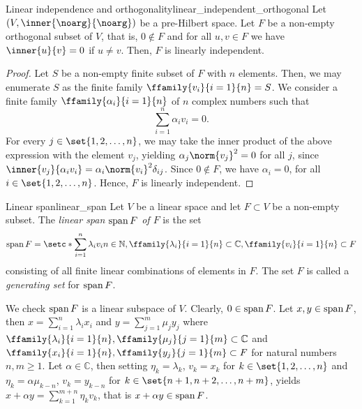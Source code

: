 \begin{lemma}{Linear independence and orthogonality}{linear_independent_orthogonal}
    Let \((V, \inner{\noarg}{\noarg})\) be a pre-Hilbert space. Let \(F\) be a non-empty orthogonal subset of \(V\), that is, \(0 \notin F\) and for all \(u,v \in F\) we have \(\inner{u}{v} = 0\) if \(u \neq v\). Then, \(F\) is linearly independent.
\end{lemma}
\begin{proof}
    Let \(S\) be a non-empty finite subset of \(F\) with \(n\) elements. Then, we may enumerate \(S\) as the finite family \(\ffamily{v_i}{i=1}{n} = S\). We consider a finite family \(\ffamily{\alpha_i}{i=1}{n}\) of \(n\) complex numbers such that
    \begin{equation*}
        \sum_{i =1}^n \alpha_i v_i = 0.
    \end{equation*}
    For every \(j \in \set{1,2,\dots, n}\), we may take the inner product of the above expression with the element \(v_j\), yielding \(\alpha_j \norm{v_j}^2 = 0\) for all \(j\), since \(\inner{v_j}{\alpha_i v_i} = \alpha_i \norm{v_i}^2 \delta_{ij}\). Since \(0 \notin F\), we have \(\alpha_i = 0\), for all \(i \in \set{1,2,\dots, n}\). Hence, \(F\) is linearly independent.
\end{proof}

\begin{definition}{Linear span}{linear_span}
    Let \(V\) be a linear space and let \(F \subset V\) be a non-empty subset. The \emph{linear span \(\operatorname{span}{F}\) of \(F\)} is the set
    \begin{equation*}
        \lspan{F} = \setc*{\sum_{i = 1}^n \lambda_i v_i}{n \in \mathbb{N}, \ffamily{\lambda_i}{i=1}{n} \subset \mathbb{C}, \ffamily{v_i}{i=1}{n}\subset F}
    \end{equation*}
    consisting of all finite linear combinations of elements in \(F\). The set \(F\) is called a \emph{generating set} for \(\operatorname{span}{F}\).
\end{definition}
\begin{remark}
    We check \(\operatorname{span} F\) is a linear subspace of \(V\). Clearly, \(0 \in \operatorname{span} F\). Let \(x, y \in \operatorname{span} F\), then \(x = \sum_{i = 1}^{n} \lambda_i x_i\) and \(y = \sum_{j = 1}^{m} \mu_j y_j\) where \(\ffamily{\lambda_i}{i=1}{n}, \ffamily{\mu_j}{j = 1}{m} \subset \mathbb{C}\) and \(\ffamily{x_i}{i=1}{n}, \ffamily{y_j}{j=1}{m} \subset F\) for natural numbers \(n,m \geq 1\). Let \(\alpha \in \mathbb{C}\), then setting \(\eta_k = \lambda_k\), \(v_k = x_k\) for \(k \in \set{1, 2, \dots, n}\) and \(\eta_{k} = \alpha \mu_{k-n}\), \(v_{k} = y_{k-n}\) for \(k \in \set{n+1, n+2, \dots, n+m}\), yields \(x + \alpha y = \sum_{k = 1}^{m+n} \eta_k v_k\), that is \(x + \alpha y \in \operatorname{span} F\).
\end{remark}

